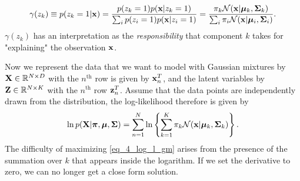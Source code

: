 \documentclass[../book-template.tex]{subfiles}
\begin{document}
\begin{align*}
	\gamma(z_k) \equiv p(z_k=1|{\bf x})= \frac{p(z_k=1)p({\bf x}|z_k=1)}{\sum_i p(z_i=1)p({\bf x}|z_i=1)}= \frac{\pi_k \mathcal{N}({\bf x}|\bm{\mu}_k, {\bf\Sigma}_k)}{\sum_{i} \pi_i \mathcal{N}({\bf x}|\bm{\mu}_i, {\bf\Sigma}_i)}.
\end{align*}
$\gamma(z_k)$ has an interpretation as the \emph{responsibility} that component $k$ takes for "explaining" the observation ${\bf x}$. 
\par Now we represent the data that we want to model with Gaussian mixtures by ${\bf X}\in \mathbb{R}^{N\times D}$ with the $n^{\text{th}}$ row is given by ${\bf x}_n^T$, and the latent variables by ${\bf Z}\in \mathbb{R}^{N\times K}$ with the $n^{\text{th}}$ row ${\bf z}_n^T$. Assume that the data points are independently drawn from the distribution, the log-likelihood therefore is given by
\begin{equation}\label{eq_4_log_l_gm}
	\ln p({\bf X}|\bm{\pi},\bm{\mu},{\bf \Sigma}) = \sum_{n=1}^{N}\ln \left\{\sum_{k=1}^{K} \pi_k \mathcal{N}({\bf x}|\bm{\mu}_k, {\bf\Sigma}_k)\right\}.
\end{equation}
The difficulty of maximizing \eqref{eq_4_log_l_gm} arises from the presence of the summation over $k$ that appears inside the logarithm. If we set the derivative to zero, we can no longer get a close form solution.
\end{document}
